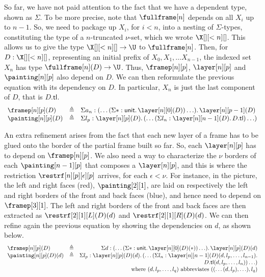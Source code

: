 \documentclass{msc}
\newcommand{\unittype}{\ensuremath{\mathsf{unit}}}
\newcommand{\unitpoint}{\ensuremath{\ast}}
\newcommand{\defeq}{\ensuremath{\triangleq}}
\newcommand{\tl}{\ensuremath{\mathsf{tl}}}
\begin{document}
So far, we have not paid attention to the fact that we have a dependent type, shown as $\Sigma$. To be more precise, note that $\fullframe[n]$ depends on all $X_i$ up to $n - 1$. So, we need to package up $X_i$, for $i < n$, into a nesting of $\Sigma$-types, constituting the type of a $n$-truncated $\nu$-set, which we wrote $\X[][<n][]$. This allows us to give the type $\X[][<n][] \rightarrow \U$ to $\fullframe[n]$. Then, for $D: \X[][<n][]$, representing an initial prefix of $X_0, X_1, \ldots X_{n - 1}$, the indexed set $X_n$ has type $\fullframe[n](D) \rightarrow \U$. Thus, $\framep[n][p]$, $\layer[n][p]$ and $\painting[n][p]$ also depend on $D$. We can then reformulate the previous equation with its dependency on $D$. In particular, $X_n$ is just the last component of $D$, that is $D.\tl$.
\begin{equation*}
  \begin{array}{lll}
    \framep[n][p](D)   & \defeq & \Sigma a_n: (\ldots (\Sigma \unitpoint: \unittype.\, \layer[n][0](D)) \ldots) .\,\layer[n][p - 1](D) \\
    \painting[n][p](D) & \defeq & \Sigma l_p: \layer[n][p](D).\, (\ldots (\Sigma l_n: \layer[n][n - 1](D) .\, D.\tl) \ldots)
  \end{array}
\end{equation*}

An extra refinement arises from the fact that each new layer of a frame has to be glued onto the border of the partial frame built so far. So, each $\layer[n][p]$ has to depend on $\framep[n][p]$. We also need a way to characterize the $\nu$ borders of each $\painting[n-1][p]$ that composes a $\layer[n][p]$, and this is where the restriction $\restrf[n][p][\epsilon][p]$ arrives, for each $\epsilon < \nu$. For instance, in the picture, the left and right faces (red), $\painting[2][1]$, are laid on respectively the left and right borders of the front and back faces (blue), and hence need to depend on $\framep[3][1]$. The left and right borders of the front and back faces are then extracted as $\restrf[2][1][L](D)(d)$ and $\restrf[2][1][R](D)(d)$. We can then refine again the previous equation by showing the dependencies on $d$, as shown below.
\begin{equation*}
  \begin{array}{llr}
    \framep[n][p](D)      & \defeq & \Sigma d: (\ldots (\Sigma \unitpoint: \unittype.\, \layer[n][0](D)(\unitpoint)) \ldots).\, \layer[n][p](D)(d) \\
    \painting[n][p](D)(d) & \defeq & \Sigma l_p: \layer[n][p](D)(d).\, (\ldots (\Sigma l_n: \layer[n][n - 1](D)(d, l_p, \ldots, l_{n - 1}).        \\
                          &        & D.\tl(d, l_p, \ldots, l_n)) \ldots)                                                                           \\
                          &        & \text{where } (d, l_p, \ldots, l_q) \text{ abbreviates } ((\ldots(d, l_p), \ldots), l_q)
  \end{array}
\end{equation*}
\end{document}
